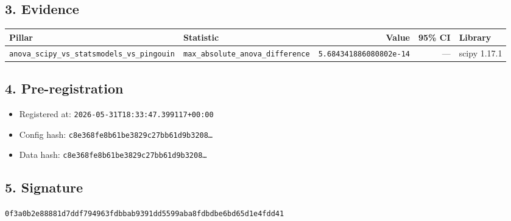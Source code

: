\documentclass{article}
\begin{document}
\subsection*{3. Evidence}
\begin{tabular}{llrrl}\toprule
\textbf{Pillar} & \textbf{Statistic} & \textbf{Value} & \textbf{95\% CI} & \textbf{Library} \\\midrule
\texttt{anova\_scipy\_vs\_statsmodels\_vs\_pingouin} & \texttt{max\_absolute\_anova\_difference} & \texttt{5.684341886080802e-14} & --- & scipy 1.17.1 \\
\bottomrule\end{tabular}
\subsection*{4. Pre-registration}
\begin{itemize}
\item Registered at: \texttt{2026-05-31T18:33:47.399117+00:00}
\item Config hash: \texttt{c8e368fe8b61be3829c27bb61d9b3208\dots}
\item Data hash: \texttt{c8e368fe8b61be3829c27bb61d9b3208\dots}
\end{itemize}
\subsection*{5. Signature}
\texttt{0f3a0b2e88881d7ddf794963fdbbab9391dd5599aba8fdbdbe6bd65d1e4fdd41}\\
\end{document}
